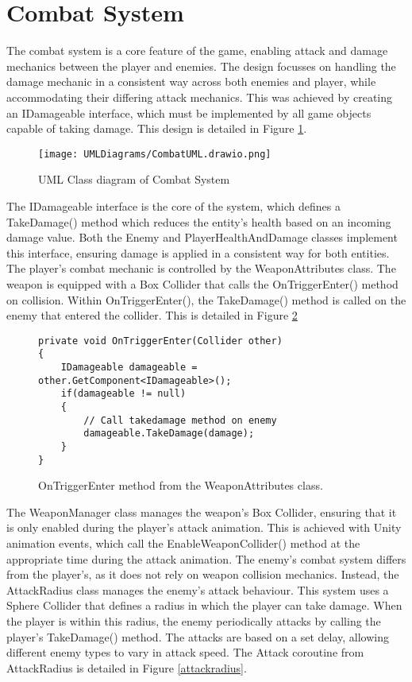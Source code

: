 \documentclass[10pt]{final_report}
\begin{document}
\section{Combat System}\label{combatsystem}
The combat system is a core feature of the game, enabling attack and damage mechanics between the player and enemies. The design focusses on handling the damage mechanic in a consistent way across both enemies and player, while accommodating their differing attack mechanics. This was achieved by creating an IDamageable interface, which must be implemented by all game objects capable of taking damage. This design is detailed in Figure  \ref{fig:label_combat}.
\begin{figure}[H]
    \centering
    \texttt{[image: UMLDiagrams/CombatUML.drawio.png]}
    \caption{UML Class diagram of Combat System}
    \label{fig:label_combat}
\end{figure}
The IDamageable interface is the core of the system, which defines a TakeDamage() method which reduces the entity's health based on an incoming damage value. Both the Enemy and PlayerHealthAndDamage classes implement this interface, ensuring damage is applied in a consistent way for both entities. 
\newline The player's combat mechanic is controlled by the WeaponAttributes class. The weapon is equipped with a Box Collider that calls the OnTriggerEnter() method on collision. Within OnTriggerEnter(), the TakeDamage() method is called on the enemy that entered the collider. This is detailed in Figure \ref{ontriggerenter2} 
\begin{figure}[H]
\begin{verbatim}
private void OnTriggerEnter(Collider other)
{
    IDamageable damageable = other.GetComponent<IDamageable>();
    if(damageable != null)
    {
        // Call takedamage method on enemy
        damageable.TakeDamage(damage);
    }
}
\end{verbatim}
\caption{OnTriggerEnter method from the WeaponAttributes class.}
\label{ontriggerenter2}
\end{figure}
The WeaponManager class manages the weapon's Box Collider, ensuring that it is only enabled during the player's attack animation. This is achieved with Unity animation events, which call the EnableWeaponCollider() method at the appropriate time during the attack animation.\newline 
The enemy's combat system differs from the player's, as it does not rely on weapon collision mechanics. Instead, the AttackRadius class manages the enemy's attack behaviour. This system uses a Sphere Collider that defines a radius in which the player can take damage. When the player is within this radius, the enemy periodically attacks by calling the player's TakeDamage() method. The  attacks are based on a set delay, allowing different enemy types to vary in attack speed. The Attack coroutine from AttackRadius is detailed in Figure \ref{attackradius}.
\end{document}
